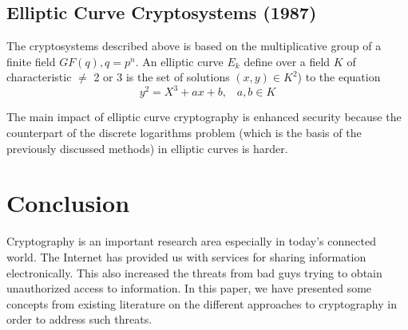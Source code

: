 \documentclass{article}
\begin{document}
\subsection{Elliptic Curve Cryptosystems (1987)}

The cryptosystems described above is based on the multiplicative group
of a finite field $GF(q),q=p^{n}$\cite{koblitz_elliptic_1987}. An
elliptic curve $E_{k}$ define over a field $K$ of characteristic
$\neq$ 2 or 3 is the set of solutions $(x,y)\in K^{2}$) to the equation
\[
y^{2}=X^{3}+ax+b,\;\;\; a,b\in K
\]


The main impact of elliptic curve cryptography is enhanced security
because the counterpart of the discrete logarithms problem (which
is the basis of the previously discussed methods) in elliptic curves
is harder\cite{koblitz_elliptic_1987}. 


\section{Conclusion} 

Cryptography is an important research area especially in today's connected world. The Internet has provided us with services for sharing information electronically. This also increased the threats from bad guys trying to obtain unauthorized access to information. In this paper, we have presented some concepts from existing literature on the different approaches to cryptography in order to address such threats.



\nocite{*}
\end{document}
